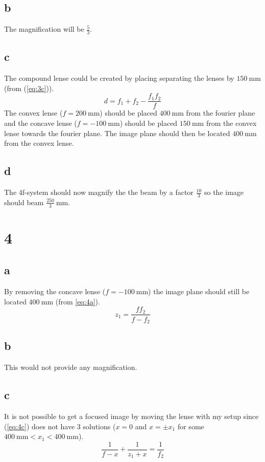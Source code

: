 \documentclass[12pt,a4paper]{article}
\begin{document}
\subsection{b}\label{sec:3b}
The magnification will be $\frac{5}{3}$.
\subsection{c}\label{sec:3c}
The compound lense could be created by placing separating the lenses by $\SI{150}{\milli\metre}$ (from (\ref{eq:3c})).
\begin{equation}
  \label{eq:3c}
  d=f_1+f_2-\frac{f_1f_2}{f}
\end{equation}
The convex lense ($f=\SI{200}{\milli\metre}$) should be placed $\SI{400}{\milli\metre}$ from the fourier plane and the concave lense ($f=\SI{-100}{\milli\metre}$) should be placed $\SI{150}{\milli\metre}$ from the convex lense towards the fourier plane. The image plane should then be located $\SI{400}{\milli\metre}$ from the convex lense.
\subsection{d}\label{sec:3d}
The 4f-system should now magnify the the beam by a factor $\frac{10}{3}$ so the image should beam $\frac{250}{3}\SI{}{\milli\metre}$.
\section{4}\label{sec:4}
\subsection{a}\label{sec:4a}
By removing the concave lense ($f=\SI{-100}{\milli\metre}$) the image plane should still be located $\SI{400}{\milli\metre}$ (from \ref{eq:4a}).
\begin{equation}
  \label{eq:4a}
  z_1=\frac{ff_2}{f-f_2}
\end{equation}
\subsection{b}\label{sec:4b}
This would not provide any magnification.
\subsection{c}\label{sec:4c}
It is not possible to get a focused image by moving the lense with my setup since (\ref{eq:4c}) does not have 3 solutions ($x=0$ and $x=\pm x_1$ for some $\SI{400}{\milli\metre}<x_1<\SI{400}{\milli\metre}$).
\begin{equation}
  \label{eq:4c}
  \frac{1}{f-x}+\frac{1}{z_1+x}=\frac{1}{f_2}
\end{equation}
\end{document}
